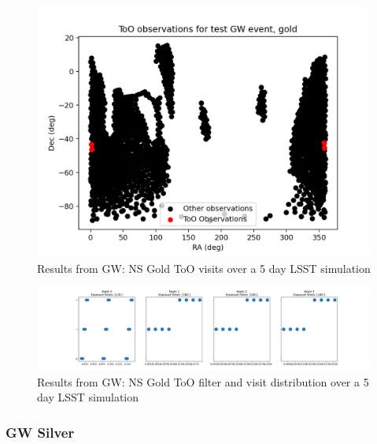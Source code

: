\begin{figure}
    \centering
    \includegraphics[width=\linewidth]{figures/validationTests/SVRequired/GWGoldPosition.png}
    \caption{Results from GW: NS Gold ToO visits over a 5 day LSST simulation}
    \label{fig:GWGoldPositionResult}
\end{figure}

\begin{figure}
    \centering
    \includegraphics[width=\linewidth]{figures/validationTests/SVRequired/GWGoldFilterPlot.png}
    \caption{Results from GW: NS Gold ToO filter and visit distribution over a 5 day LSST simulation}
    \label{fig:GWGoldFilterResult}
\end{figure}

\newpage

\subsubsection{GW Silver}

